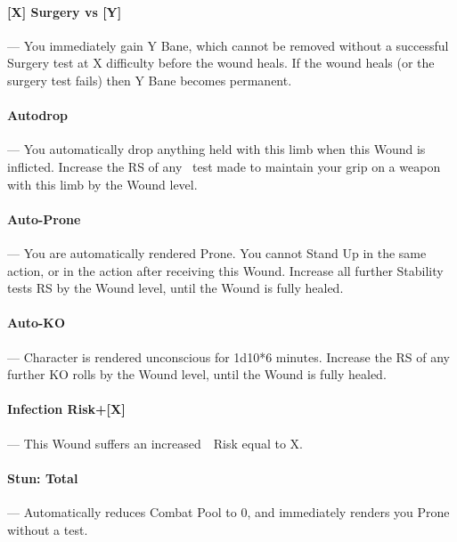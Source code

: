 \documentclass[oneside,11pt,english]{book}
\begin{document}
\vspace{-5pt}\paragraph[Surgery vs. ]{\label{par:Surgery vs}[X] Surgery vs [Y]}---\quad
You immediately gain Y Bane, which cannot be removed without a successful Surgery test at X difficulty before the wound heals. If the wound heals (or the surgery test fails) then Y Bane becomes permanent.

\vspace{-5pt}\paragraph{\label{par:Autodrop}Autodrop}---\quad 
You automatically drop anything held with this limb when this Wound is inflicted. Increase the RS of any ~test made to maintain your grip on a weapon with this limb by the Wound level. %

\vspace{-5pt}\paragraph{\label{par:Auto-Prone}Auto-Prone}---\quad
You are automatically rendered Prone. You cannot Stand Up in the same action, or in the action after receiving this Wound. Increase all further Stability tests RS by the Wound level, until the Wound is fully healed.

\vspace{-5pt}\paragraph{\label{par:Auto-KO}Auto-KO}---\quad
Character is rendered unconscious for 1d10*6 minutes. Increase the RS of any further KO rolls by the Wound level, until the Wound is fully healed.

\vspace{-5pt}\paragraph[Infection Risk]{\label{par:Infection Risk}Infection Risk+[X]}---\quad
This Wound suffers an increased~~Risk equal to X.

\vspace{-5pt}\paragraph[Total]{\label{par:Stun: Total}Stun: Total}---\quad
Automatically reduces Combat Pool to 0, and immediately renders you Prone without a test.
\end{document}
